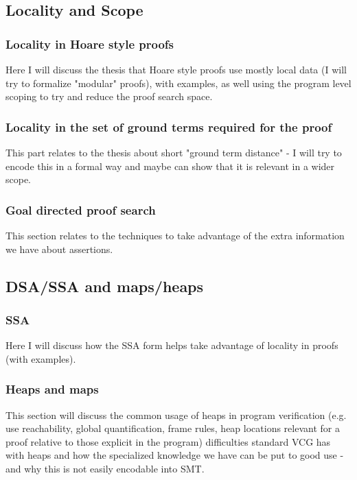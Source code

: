 \subsection{Locality and Scope}
	\subsubsection{Locality in Hoare style proofs}
	Here I will discuss the thesis that Hoare style proofs use mostly local data (I will try to formalize "modular" proofs), with examples, as well using the program level scoping to try and reduce the proof search space.
	\subsubsection{Locality in the set of ground terms required for the proof}
	This part relates to the thesis about short "ground term distance" - I will try to encode this in a formal way and maybe can show that it is relevant in a wider scope.
	\subsubsection{Goal directed proof search}
	This section relates to the techniques to take advantage of the extra information we have about assertions.

\subsection{DSA/SSA and maps/heaps}
	\subsubsection{SSA}
		Here I will discuss how the SSA form helps take advantage of locality in proofs (with examples).
	\subsubsection{Heaps and maps}
		This section will discuss the common usage of heaps in program verification (e.g. use reachability, global quantification, frame rules, heap locations relevant for a proof relative to those explicit in the program) difficulties standard VCG has with heaps and how the specialized knowledge we have can be put to good use - and why this is not easily encodable into SMT.

